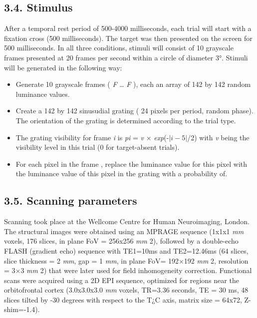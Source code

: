 \documentclass[
]{article}
\providecommand{\tightlist}{%
  \setlength{\itemsep}{0pt}\setlength{\parskip}{0pt}}
\begin{document}
\hypertarget{stimulus}{%
\subsection{3.4. Stimulus}\label{stimulus}}

After a temporal rest period of 500-4000 milliseconds, each trial will
start with a fixation cross (500 milliseconds). The target was then
presented on the screen for 500 milliseconds. In all three conditions,
stimuli will consist of 10 grayscale frames presented at 20 frames per
second within a circle of diameter 3°. Stimuli will be generated in the
following way:

\begin{itemize}
\tightlist
\item
  Generate 10 grayscale frames ( \emph{F} \ldots{} \emph{F} ), each an
  array of 142 by 142 random luminance values.
\item
  Create a 142 by 142 sinusudial grating ( 24 pixels per period, random
  phase). The orientation of the grating is determined according to the
  trial type.
\item
  The grating visibility for frame \emph{i} is \emph{pi} = \emph{v} ×
  \emph{exp}(-\(|\textit{i}-5|\)/2) with \emph{v} being the visibility
  level in this trial (0 for target-absent trials).
\item
  For each pixel in the frame , replace the luminance value for this
  pixel with the luminance value of this pixel in the grating with a
  probability of.
\end{itemize}

\hypertarget{scanning-parameters}{%
\subsection{3.5. Scanning parameters}\label{scanning-parameters}}

Scanning took place at the Wellcome Centre for Human Neuroimaging,
London. The structural images were obtained using an MPRAGE sequence
(1x1x1 \emph{mm} voxels, 176 slices, in plane FoV = 256x256 \emph{mm}
2), followed by a double-echo FLASH (gradient echo) sequence with
TE1=10ms and TE2=12.46ms (64 slices, slice thickness = 2 \emph{mm}, gap
= 1 \emph{mm}, in plane FoV= 192×192 \emph{mm} 2, resolution = 3×3
\emph{mm} 2) that were later used for field inhomogeneity correction.
Functional scans were acquired using a 2D EPI sequence, optimized for
regions near the orbitofrontal cortex (3.0x3.0x3.0 \emph{mm} voxels,
TR=3.36 seconds, TE = 30 ms, 48 slices tilted by -30 degrees with
respect to the T¿C axis, matrix size = 64x72, Z-shim=-1.4).
\end{document}
